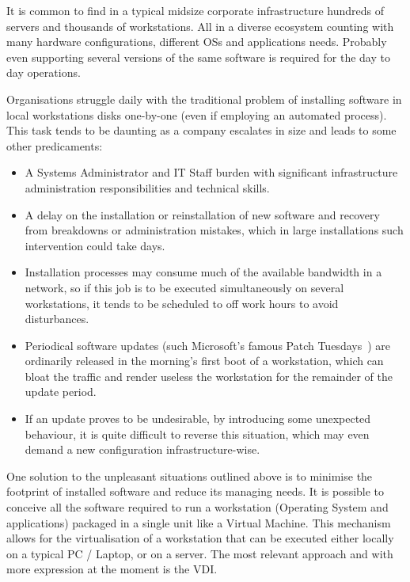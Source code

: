 It is common to find in a typical midsize corporate infrastructure hundreds of servers and thousands of workstations. All in a diverse ecosystem counting with many hardware configurations, different OSs and applications needs. Probably even supporting several versions of the same software is required for the day to day operations.

Organisations struggle daily with the traditional problem of installing software in local workstations disks one-by-one (even if employing an automated process). This task tends to be daunting as a company escalates in size and leads to some other predicaments:

\begin{itemize}
	\item A Systems Administrator and IT Staff burden with significant infrastructure administration responsibilities and technical skills.
	\item A delay on the installation or reinstallation of new software and recovery from breakdowns or administration mistakes, which in large installations such intervention could take days.
	\item Installation processes may consume much of the available bandwidth in a network, so if this job is to be executed simultaneously on several workstations, it tends to be scheduled to off work hours to avoid disturbances.
	\item Periodical software updates (such Microsoft's famous Patch Tuesdays~\cite{patch_2017}) are ordinarily released in the morning's first boot of a workstation, which can bloat the traffic and render useless the workstation for the remainder of the update period.
	\item If an update proves to be undesirable, by introducing some unexpected behaviour, it is quite difficult to reverse this situation, which may even demand a new configuration infrastructure-wise.
\end{itemize}

One solution to the unpleasant situations outlined above is to minimise the footprint of installed software and reduce its managing needs. It is possible to conceive all the software required to run a workstation (Operating System and applications) packaged in a single unit like a Virtual Machine. This mechanism allows for the virtualisation of a workstation that can be executed either locally on a typical PC / Laptop, or on a server. The most relevant approach and with more expression at the moment is the \gls{VDI}.

